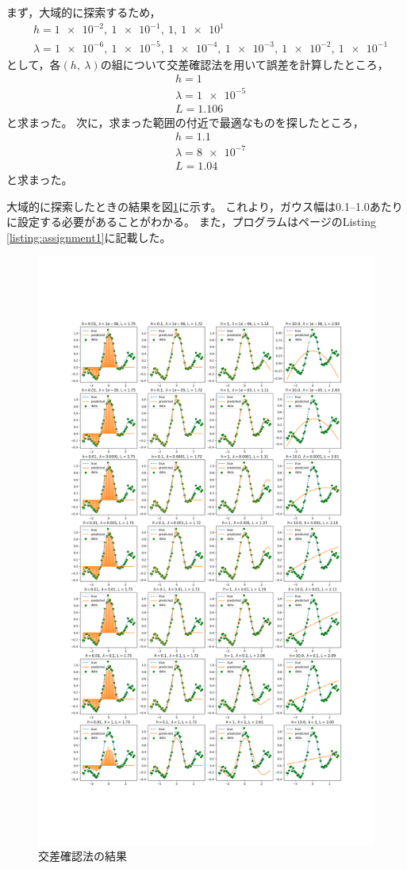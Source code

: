 \documentclass[class=jsarticle, crop=false, dvipdfmx, fleqn]{standalone}
\begin{document}
まず，大域的に探索するため，
\begin{align}
	& h = \num{1e-2},\ \num{1e-1},\ \num{1},\ \num{1e1} \\
	& \lambda = \num{1e-6},\ \num{1e-5},\ \num{1e-4},\ \num{1e-3},\ \num{1e-2},\ \num{1e-1}
\end{align}
として，各$(h,\ \lambda)$の組について交差確認法を用いて誤差を計算したところ，
\begin{align}
	& h = 1 \\
	& \lambda = \num{1e-5} \\
	& L = 1.106
\end{align}
と求まった。
次に，求まった範囲の付近で最適なものを探したところ，
\begin{align}
	& h = 1.1 \\
	& \lambda = \num{8e-7} \\
	& L = 1.04
\end{align}
と求まった。

大域的に探索したときの結果を図\ref{fig:result_global_search}に示す。
これより，ガウス幅は0.1--1.0あたりに設定する必要があることがわかる。
また，プログラムは\pageref{listing:assignment1}ページのListing \ref{listing:assignment1}に記載した。

\begin{figure}
	\centering
	\includegraphics[clip, width=15cm, trim=0 144 0 216]{../figures/assignment1_result}
	\caption{交差確認法の結果}
	\label{fig:result_global_search}
\end{figure}
\end{document}
